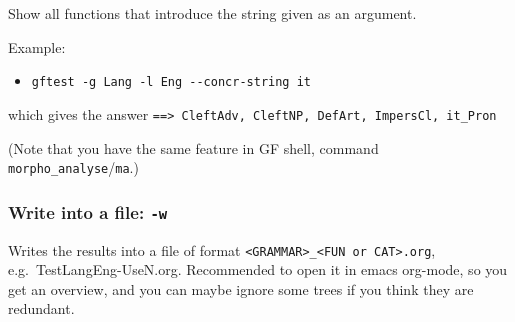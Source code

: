 Show all functions that introduce the string given as an argument.

Example:

\begin{itemize}
\tightlist
\item
  \texttt{gftest\ -g\ Lang\ -l\ Eng\ -\/-concr-string\ it}
\end{itemize}

which gives the answer
\texttt{==\textgreater{}\ CleftAdv,\ CleftNP,\ DefArt,\ ImpersCl,\ it\_Pron}

(Note that you have the same feature in GF shell, command
\texttt{morpho\_analyse}/\texttt{ma}.)

\hypertarget{write-into-a-file--w}{%
\subsubsection{\texorpdfstring{Write into a file:
\texttt{-w}}{Write into a file: -w}}\label{write-into-a-file--w}}

Writes the results into a file of format
\texttt{\textless{}GRAMMAR\textgreater{}\_\textless{}FUN\ or\ CAT\textgreater{}.org},
e.g.~TestLangEng-UseN.org. Recommended to open it in emacs org-mode, so
you get an overview, and you can maybe ignore some trees if you think
they are redundant.

